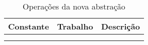 \begin{table}[]
\centering

\begin{tabular}{|l|l|l|}
\hline
\textbf{Constante} & \textbf{Trabalho} & \textbf{Descrição} \\ \hline
& & \\ \hline
& & \\ \hline
\end{tabular}

\caption{Operações da nova abstração}
\label{tab:ops_atomize}
\end{table}
